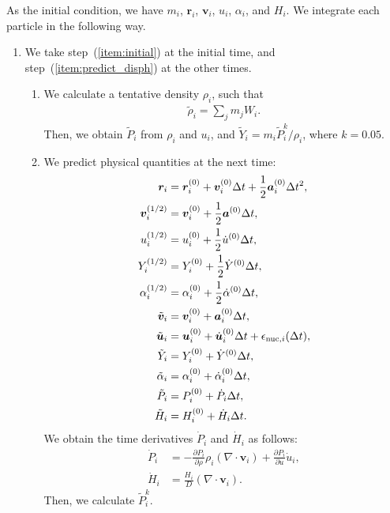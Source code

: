 \documentclass[fleqn,dvipdfmx]{article}
\begin{document}
As the initial condition, we have $m_i$, $\bm{r}_i$, $\bm{v}_i$,
$u_i$, $\alpha_i$, and $H_i$. We integrate each particle in the
following way.
\begin{enumerate}

\item We take step~(\ref{item:initial}) at the initial time, and
  step~(\ref{item:predict_disph}) at the other times.

  \begin{enumerate}
  \item \label{item:initial} We calculate a tentative density
    $\rho_i$, such that
    \begin{align}
      \tilde{\rho}_i = \sum_j m_j W_i.
    \end{align}
    Then, we obtain $\tilde{P}_i$ from $\rho_i$ and $u_i$, and
    $\tilde{Y}_i=m_i\tilde{P}_i^k/\rho_i$, where $k=0.05$.

  \item \label{item:predict_disph} We predict physical quantities at
    the next time:
    \begin{align}
      \bm{r}_{i} &= \bm{r}^{(0)}_i + \bm{v}^{(0)}_i \Delta t +
      \frac{1}{2} \bm{a}^{(0)}_i \Delta t^2, \\
      \bm{v}^{(1/2)}_i &= \bm{v}^{(0)}_i + \frac{1}{2} \bm{a}^{(0)}
      \Delta t, \\
      u^{(1/2)}_i &= u^{(0)}_i + \frac{1}{2} \dot{u}^{(0)} \Delta t, \\
      Y^{(1/2)}_i &= Y^{(0)}_i + \frac{1}{2} \dot{Y}^{(0)} \Delta t,
      \\
      \alpha^{(1/2)}_i &= \alpha^{(0)}_i + \frac{1}{2}
      \dot{\alpha}^{(0)} \Delta t, \\
      \tilde{\bm{v}}_{i} &= \bm{v}^{(0)}_i + \bm{a}^{(0)}_i \Delta t, \\
      \tilde{\bm{u}}_{i} &= \bm{u}^{(0)}_i + \dot{\bm{u}}^{(0)}_i \Delta
      t + \epsilon_{{\rm nuc},i}(\Delta t), \\
      \tilde{Y}_i &= Y^{(0)}_i + \dot{Y}^{(0)} \Delta t, \\
      \tilde{\alpha}_i &= \alpha^{(0)}_i + \dot{\alpha}^{(0)}_i \Delta
      t, \\
      \tilde{P}_i &= P^{(0)}_i + \dot{P}_i \Delta t, \\
      \tilde{H}_i &= H^{(0)}_i + \dot{H}_i \Delta t.
    \end{align}
    We obtain the time derivatives $\dot{P}_i$ and $\dot{H}_i$ as follows:
    \begin{align}
      \dot{P}_i &= - \frac{\partial P_i}{\partial \rho} \rho_i (
      \nabla \cdot \bm{v}_i) + \frac{\partial P_i}{\partial u}
      \dot{u}_i, \\
      \dot{H}_i &= \frac{H_i}{D} (\nabla \cdot \bm{v}_i).
    \end{align}
    Then, we calculate $\tilde{P}_i^k$.
  \end{enumerate}


\end{enumerate}
\end{document}
